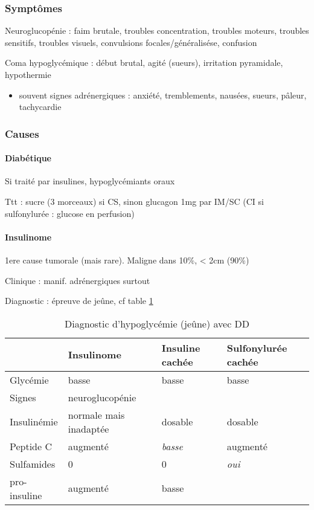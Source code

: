 \documentclass[11pt]{article}
\begin{document}
\subsubsection{Symptômes}
\label{sec:org85e75af}
Neuroglucopénie : faim brutale, troubles concentration, troubles moteurs,
troubles sensitifs, troubles visuels, convulsions focales/généralisése,
confusion

Coma hypoglycémique : début brutal, agité (sueurs), irritation pyramidale, hypothermie

\begin{itemize}
\item souvent signes adrénergiques : anxiété, tremblements, nausées, sueurs,
pâleur, tachycardie
\end{itemize}

\subsubsection{Causes}
\label{sec:org32e0edf}
\paragraph{Diabétique}
\label{sec:org1715de6}
Si traité par insulines, hypoglycémiants oraux

Ttt : sucre (3 morceaux) si CS, sinon glucagon 1mg par IM/SC (CI si
sulfonylurée : glucose en perfusion)

\paragraph{Insulinome}
\label{sec:org61243a5}
1ere cause tumorale (mais rare). Maligne dans 10\%, < 2cm (90\%)

Clinique : manif. adrénergiques surtout

Diagnostic : épreuve de jeûne, cf table \ref{tab:orgb70d2f3}

\begin{table}[htbp]
\caption{\label{tab:orgb70d2f3}
Diagnostic d'hypoglycémie (jeûne) avec DD}
\centering
\begin{tabular}{llll}
 & Insulinome & Insuline cachée & Sulfonylurée cachée\\
\hline
Glycémie & basse & basse & basse\\
Signes & neuroglucopénie &  & \\
Insulinémie & normale mais inadaptée & dosable & dosable\\
Peptide C & augmenté & \emph{basse} & augmenté\\
Sulfamides & 0 & 0 & \emph{oui}\\
pro-insuline & augmenté & basse & \\
\end{tabular}
\end{table}
\end{document}
